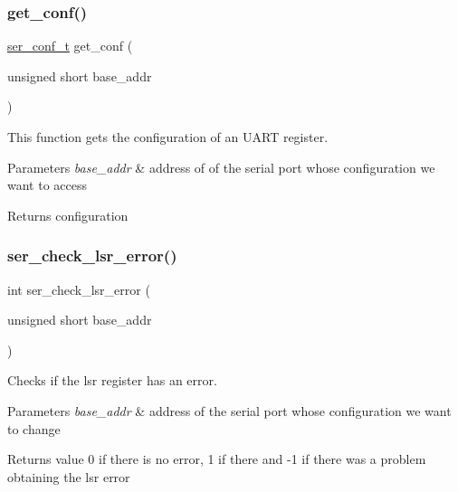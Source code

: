 \subsubsection{\texorpdfstring{get\+\_\+conf()}{get\_conf()}}
{\footnotesize\ttfamily \hyperlink{structser__conf__t}{ser\+\_\+conf\+\_\+t} get\+\_\+conf (\begin{DoxyParamCaption}\item[{unsigned short}]{base\+\_\+addr }\end{DoxyParamCaption})}



This function gets the configuration of an U\+A\+RT register. 


\begin{DoxyParams}{Parameters}
{\em base\+\_\+addr} & address of of the serial port whose configuration we want to access\\
\hline
\end{DoxyParams}
\begin{DoxyReturn}{Returns}
configuration 
\end{DoxyReturn}
\hypertarget{group__ser__port_gaf51d56fa6069ce68bb9f34a1396b2ea1}{}\label{group__ser__port_gaf51d56fa6069ce68bb9f34a1396b2ea1} 
\subsubsection{\texorpdfstring{ser\+\_\+check\+\_\+lsr\+\_\+error()}{ser\_check\_lsr\_error()}}
{\footnotesize\ttfamily int ser\+\_\+check\+\_\+lsr\+\_\+error (\begin{DoxyParamCaption}\item[{unsigned short}]{base\+\_\+addr }\end{DoxyParamCaption})}



Checks if the lsr register has an error. 


\begin{DoxyParams}{Parameters}
{\em base\+\_\+addr} & address of the serial port whose configuration we want to change\\
\hline
\end{DoxyParams}
\begin{DoxyReturn}{Returns}
value 0 if there is no error, 1 if there and -\/1 if there was a problem obtaining the lsr error 
\end{DoxyReturn}
\hypertarget{group__ser__port_ga46bbb861095c5b7a44a33af5e19be100}{}\label{group__ser__port_ga46bbb861095c5b7a44a33af5e19be100} 
